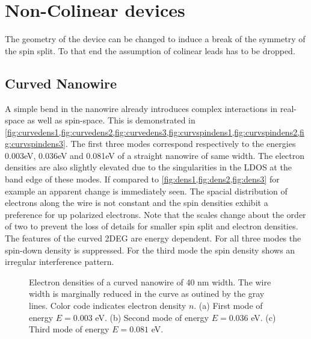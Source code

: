 \section{Non-Colinear devices}
The geometry of the device can be changed to induce a break of the symmetry of the spin split. To that end the assumption of colinear leads has to be dropped.
\subsection{Curved Nanowire}
A simple bend in the nanowire already introduces complex interactions in real-space as well as spin-space. This is demonstrated in \cref{fig:curvedens1,fig:curvedens2,fig:curvedens3,fig:curvspindens1,fig:curvspindens2,fig:curvspindens3}. The first three modes correspond respectively to the energies 0.003eV, 0.036eV and 0.081eV of a straight nanowire of same width. The electron densities are also slightly elevated due to the singularities in the LDOS at the band edge of these modes. If compared to \cref{fig:dens1,fig:dens2,fig:dens3} for example an apparent change is immediately seen. The spacial distribution of electrons along the wire is not constant and the spin densities exhibit a preference for up polarized electrons. Note that the scales change about the order of two to prevent the loss of details for smaller spin split and electron densities. The features of the curved 2DEG are energy dependent. For all three modes the spin-down density is suppressed. For the third mode the spin density shows an irregular interference pattern.\par
\begin{figure}[h!]
\caption{Electron densities of a curved nanowire of 40 nm width. The wire width is marginally reduced in the curve as outined by the gray lines. Color code indicates electron density $n$. (a) First mode of energy $E=0.003$ eV. (b) Second mode of energy $E=0.036$ eV. (c) Third mode of energy $E=0.081$ eV. }
\end{figure}

